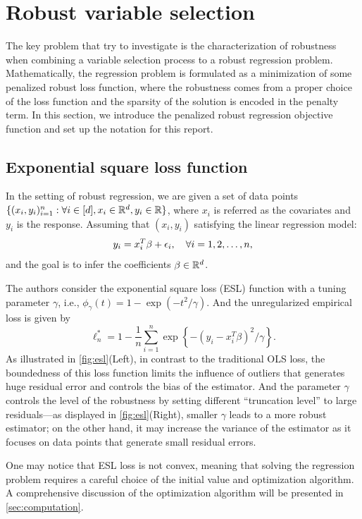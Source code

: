 \section{Robust variable selection} 
The key problem that \citet{wang2013robust} try to investigate is the  characterization of robustness when combining a variable selection process to a robust regression problem. Mathematically, the regression problem is formulated as a  minimization of some penalized robust loss function, where the robustness comes from a proper choice of the loss function and the sparsity of the solution is encoded in the penalty term. In this section, we introduce the penalized robust regression objective function and set up the notation for this report.


\subsection{Exponential square loss function} \label{sec:esl}
In the setting of robust regression, we are given a set of data points $\{(x_i, y_i)_{i=1}^n: \forall i\in [d],  x_i \in \mathbb{R}^d, y_i \in \mathbb{R}\}$, where $x_i$ is referred as the covariates and $y_i$ is the response. Assuming that $(x_i, y_i)$ satisfying the linear regression model:
\[
y_i = x_i^T \beta +\epsilon_i, \quad \forall i = 1, 2, \dots , n,     
\] 
and the goal is to infer the coefficients $\beta \in \mathbb{R}^d$. 

The authors consider the exponential square loss (ESL) function with a tuning parameter $\gamma$, i.e., $\phi_\gamma(t)= 1-  \exp (-t^2/\gamma)$. And the unregularized empirical loss is given by
\[
 \ell_n^* = 1- \frac{1}{n}\sum_{i = 1}^ n \exp \left\{ -(y_i- x_i^T\beta)^2/\gamma\right\}  .    
\]
As illustrated in \cref{fig:esl}(Left), in contrast to the traditional OLS loss, the boundedness of this loss function limits the influence of outliers that generates huge residual error and controls the bias of the estimator. And the  
parameter $\gamma$ controls the level of the robustness by setting different ``truncation level'' to large residuals---as displayed in \cref{fig:esl}(Right), 
smaller $\gamma$ leads to a more robust estimator; on the other hand, it may increase the variance of the estimator as it focuses on data points that generate small residual errors.  

One may notice that ESL loss is not convex, meaning that solving the regression problem requires a careful choice of the initial value and optimization algorithm.
A comprehensive discussion of the optimization algorithm will be presented in \cref{sec:computation}.




